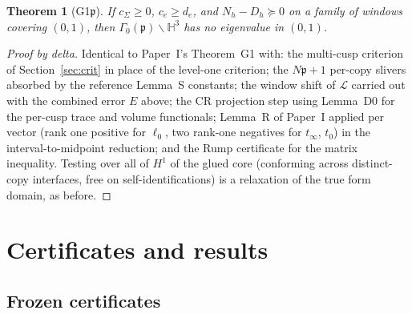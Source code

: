 \documentclass[11pt]{amsart}
\newtheorem{theorem}{Theorem}[section]
\newcommand{\HH}{\mathbb{H}^3}
\newcommand{\p}{\mathfrak{p}}
\begin{document}
\begin{theorem}[G1$\p$]\label{thm:G1p}
If $c_\Sigma\ge 0$, $c_e\ge d_e$, and $N_h-D_h\succeq 0$ on a family of
windows covering $(0,1)$, then $\Gamma_0(\p)\backslash\HH$ has no
eigenvalue in $(0,1)$.
\end{theorem}

\begin{proof}[Proof by delta]
Identical to Paper~I's Theorem~G1 with: the multi-cusp criterion of
Section~\ref{sec:crit} in place of the level-one criterion; the $N\p+1$
per-copy slivers absorbed by the reference Lemma~S constants; the window
shift of $\mathcal{L}$ carried out with the combined error $E$ above; the
CR projection step using Lemma~D0 for the per-cusp trace and volume
functionals; Lemma~R of Paper~I applied per vector (rank one positive for
$\ell_0$, two rank-one negatives for $t_\infty$, $t_0$) in the
interval-to-midpoint reduction; and the Rump certificate for the matrix
inequality.  Testing over all of $H^1$ of the glued core (conforming
across distinct-copy interfaces, free on self-identifications) is a
relaxation of the true form domain, as before.
\end{proof}

\section{Certificates and results}\label{sec:results}

\subsection{Frozen certificates}
\end{document}
